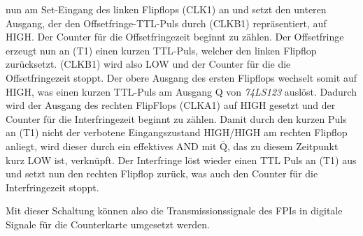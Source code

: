 nun am Set-Eingang des linken Flipflops (CLK1) an und setzt den unteren
Ausgang, der den Offsetfringe-TTL-Puls durch (CLKB1) repräsentiert, auf HIGH.
Der Counter für die Offsetfringezeit beginnt zu zählen. Der Offsetfringe
erzeugt nun an (T1) einen kurzen TTL-Puls, welcher den linken Flipflop zurücksetzt. (CLKB1) wird also LOW und der Counter
für die die Offsetfringezeit stoppt. Der obere Ausgang des ersten Flipflops
wechselt somit auf HIGH, was einen kurzen TTL-Puls am Ausgang Q von
\textit{74LS123} auslöst. Dadurch wird der Ausgang des rechten FlipFlops (CLKA1) auf HIGH gesetzt
und der Counter für die Interfringezeit beginnt zu zählen. Damit durch den
kurzen Puls an (T1) nicht der verbotene Eingangszustand HIGH/HIGH am rechten
Flipflop anliegt, wird dieser durch ein effektives AND mit
$\overline{\text{Q}}$, das zu diesem Zeitpunkt kurz LOW ist, verknüpft. Der
Interfringe löst wieder einen TTL Puls an (T1) aus und setzt nun den rechten
Flipflop zurück, was auch den Counter für die Interfringezeit stoppt.\par
Mit dieser Schaltung können also die Transmissionssignale des FPIs in digitale
Signale für die Counterkarte umgesetzt werden.

